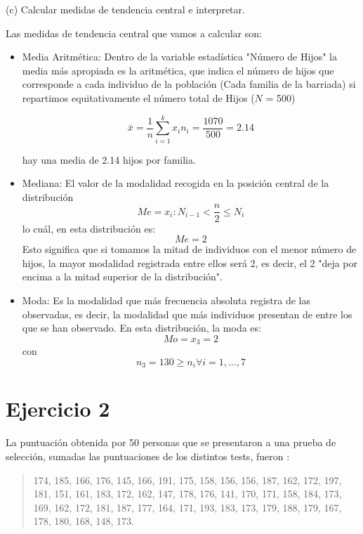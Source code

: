 \documentclass[a4paper,12pt]{article}
\begin{document}
(c) Calcular medidas de tendencia central e interpretar.

Las medidas de tendencia central que vamos a calcular son:
\begin{itemize}
    \item Media Aritmética: Dentro de la variable estadística "Número de Hijos" la media más apropiada es la aritmética, que indica el número de hijos que corresponde a cada individuo de la población (Cada familia de la barriada) si repartimos equitativamente el número total de Hijos ($N$ = 500)
\begin{center} 
    $$\bar x = \frac {1}{n} \sum\limits_{i = 1}^k {x_i n_i} = \frac {1070}{500} = 2.14$$
    
\end{center}
hay una media de 2.14 hijos por familia.

    \item Mediana: El valor de la modalidad recogida en la posición central de la distribución
    $$Me = x_i : N_{i-1} < \frac {n}{2} \leq N_i$$
    lo cuál, en esta distribución es: $$Me = 2$$
    Esto significa que si tomamos la mitad de individuos con el menor número de hijos, la mayor modalidad registrada entre ellos será 2, es decir, el 2 "deja por encima a la mitad superior de la distribución".

    \item Moda: Es la modalidad que más frecuencia absoluta registra de las observadas, es decir, la modalidad que más individuos presentan de entre los que se han observado. En esta distribución, la moda es:
    $$Mo = x_3 = 2$$ con $$n_3 = 130 \geq n_i \forall i = 1,...,7$$
\end{itemize}


\section*{Ejercicio 2} La puntuación obtenida por 50 personas que se presentaron a una prueba de selección, sumadas las puntuaciones de los distintos tests, fueron :

\begin{quote}
174, 185, 166, 176, 145, 166, 191, 175, 158, 156, 156, 187, 162, 172, 197, 181, 151, 161, 183, 172, 162, 147, 178, 176, 141, 170, 171, 158, 184, 173, 169, 162, 172, 181, 187, 177, 164, 171, 193, 183, 173, 179, 188, 179, 167, 178, 180, 168, 148, 173.
\end{quote}
\end{document}
